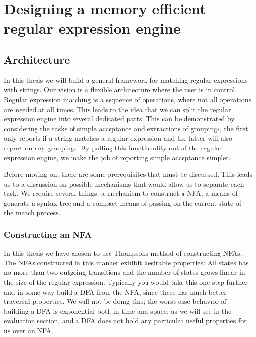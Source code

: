 \section{Designing a memory efficient regular expression engine}




\subsection{Architecture}

In this thesis we will build a general framework for matching regular
expressions with strings. Our vision is a flexible architecture where
the user is in control. Regular expression matching is a sequence of
operations, where not all operations are needed at all times. This
leads to the idea that we can split the regular expression engine into
several dedicated parts. This can be demonstrated by considering the
tasks of simple acceptance and extractions of groupings, the first
only reports if a string matches a regular expression and the latter
will also report on any groupings. By pulling this functionality out
of the regular expression engine, we make the job of reporting simple
acceptance simpler.

Before moving on, there are some prerequisites that must be
discussed. This leads us to a discussion on possible mechanisms that
would allow us to separate each task. We require several things: a
mechanism to construct a NFA, a means of generate a syntax tree and a
compact means of passing on the current state of the match process.


\subsubsection{Constructing an NFA}
In this thesis we have chosen to use Thompsons method of constructing
NFAs. The NFAs constructed in this manner exhibit desirable
properties: All states has no more than two outgoing transitions and
the number of states grows linear in the size of the regular
expression. Typically you would take this one step further and in some
way build a DFA from the NFA, since these has much better traversal
properties. We will not be doing this; the worst-case behavior of
building a DFA is exponential both in time and space, as we will see
in the evaluation section, and a DFA does not hold any particular useful 
properties for us over an NFA.

